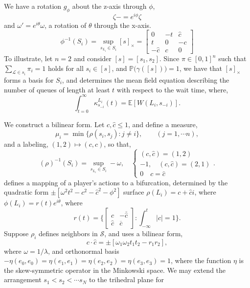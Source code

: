 \documentclass[10pt]{article}
\newcommand{\mcL}{\mathcal{L}}
\newcommand{\mcS}{\mathcal{S}}
\theoremstyle{definition}
\begin{document}
We have a rotation $g_\phi$ about the z-axis through $\phi$,
$$
    \zeta- = e^{i\phi}\zeta 
$$
and $\omega' = e^{i\theta}\omega$, a rotation of $\theta$ through the x-axis.
$$
    \phi^{-1}(S_i) = \sup_{s_{L_i} \in S_i} [s]_\times = \begin{bmatrix} 0 & -t
    & \hat c \\ t & 0 & -c\\-\hat c & c & 0\end{bmatrix}
$$
To illustrate, let $n=2$ and consider $[s]= [s_1, s_2]$. Since $\pi \in [0,1]^n$
such that $\sum_{\mcL \in s_i} \pi_i = 1$ holds for all $s_i\in [s]$, and
$\mathbb{P}\big(\gamma([s])\big) = 1$, we have that $[s]_\times$ forms a basis
for $S_i$, and determines the mean field equation
describing the number of queues of length at least $t$ with respect to the wait time, where, 
$$
    \displaystyle\int_{t=0}^\infty \kappa_{s_{-i}}^{L_i}(t) = \mathbb{E}[W(L_i, s_{-i})].
$$
We construct a bilinear form.
Let $c, \hat c \le 1$, and define a measure,
$$
    \mu_i = \min\lbrace \rho(s_i, s_j) : j\ne i\rbrace, \qquad (j = 1, \cdots
    n),
$$
and a labeling, $(1,2)\mapsto (c,\hat c)$, so that,
$$
    (\rho)^{-1}(S_i) = \sup_{s_{L_i} \in S_i} -\omega, \quad \begin{cases}
    (c,\hat c)
    = (1,2)\\ -1, \quad (c,\hat c) = (2,1) \\ 0 \quad c=\hat c\end{cases}.
$$
defines a mapping of a player's actions to a bifurcation, determined by the 
quadratic form $\pm [\omega^2 t^2 - c^2 -\hat c^2 - \phi^2]$ 
surface $\rho(L_i) = c + \hat ci$, where $\phi(L_i) = r(t)e^{i\theta}$, where
$$
    r(t) = \bigg\lbrace \begin{bmatrix} c &-\overline{\hat c}\\ \hat c & \overline
c\end{bmatrix} : \displaystyle\int_{-\infty}^t \vert c \vert = 1\bigg\rbrace.
$$
Suppose $\rho_i$ defines neighbors in $\mcS$, and uses a bilinear form,
$$  
   c\cdot \hat c = \pm [\omega_1\omega_2 t_1t_2 - r_1r_2],
$$
where $\omega = 1/\lambda$, and orthonormal basis $-\eta(e_0,e_0) = \eta(e_1,e_1) = \eta(e_2,e_2) =
\eta(e_3,e_3) = 1$, where the function $\eta$ is the skew-symmetric operator in
the Minkowski space.
We may extend the arrangement $s_1<s_2<\cdots s_N$ to the trihedral plane for
\end{document}
